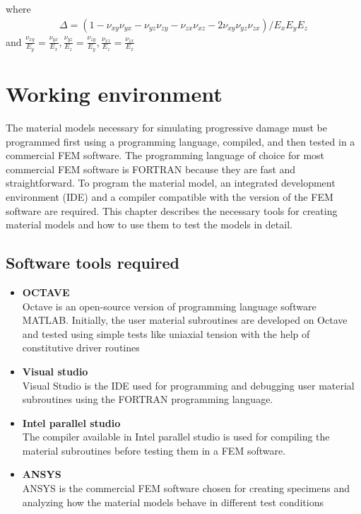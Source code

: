 \documentclass[a4paper,12pt,twoside]{report}
\begin{document}
 where 
 \begin{align*}
 \Delta = (1 - \nu_{xy}\nu_{yx} - \nu_{yz}\nu_{zy} - \nu_{zx}\nu_{xz} - 2\nu_{xy}\nu_{yz}\nu_{zx})/E_{x}E_{y}E_{z}
 \end{align*}
   and  $\frac{\nu_{xy}}{E_{y}} = \frac{\nu_{yx}}{E_{x}}, \frac{\nu_{yz}}{E_{z}} = \frac{\nu_{zy}}{E_{y}}, \frac{\nu_{xz}}{E_{z}} = \frac{\nu_{zx}}{E_{x}}$ 


\newpage
\vspace*{3cm}
\chapter{Working environment}
\vspace*{1cm}
\indent\indent\indent  The material models necessary for simulating progressive damage must be programmed first using a programming language, compiled, and then tested in a commercial FEM software. The programming language of choice for most commercial FEM software is FORTRAN because they are fast and straightforward. To program the material model, an integrated development environment (IDE) and a compiler compatible with the version of the FEM software are required. This chapter describes the necessary tools for creating material models and how to use them to test the models in detail.   
\vspace*{1cm}
\section{Software tools required}
\begin{itemize}
\item \textbf{OCTAVE}\\ \indent
\hspace*{13mm} Octave is an open-source version of programming language software MATLAB. Initially, the user material subroutines are developed on Octave and tested using simple tests like uniaxial tension with the help of constitutive driver routines
\item \textbf{Visual studio }\\
\hspace*{13mm} Visual Studio is the IDE used for programming and debugging user material subroutines using the FORTRAN programming language.
\item \textbf{Intel parallel studio}\\
\hspace*{13mm} The compiler available in Intel parallel studio is used for compiling the material subroutines before testing them in a FEM software.
\item \textbf{ANSYS }\\
\hspace*{13mm}ANSYS is the commercial FEM software chosen for creating specimens and analyzing how the material models behave in different test conditions
\end{itemize}
\end{document}
